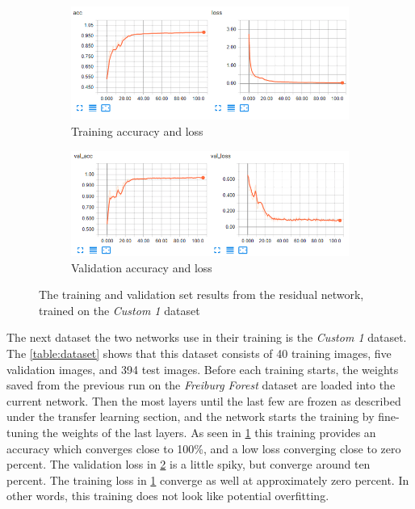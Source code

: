 \documentclass[USenglish]{ifimaster}  %
\begin{document}
\begin{figure}[ht]
\centering
\begin{subfigure}[b]{\textwidth}
\centering
\includegraphics[width=1\textwidth]{bilder/custom_1_training/Custom_1_residual_training_acc_results.png}
\caption{Training accuracy and loss}
\label{fig:custom_1_residual_acc_result}
\end{subfigure}
\hfill
\begin{subfigure}[b]{\textwidth}
\centering
\includegraphics[width=1\textwidth]{bilder/custom_1_training/Custom_1_residual_training_val_acc_results.png}
\caption{Validation accuracy and loss}
\label{fig:custom_1_residual_val_acc_result}
\end{subfigure}
\caption{The training and validation set results from the residual network, trained on the \textit{Custom 1} dataset}
\label{fig:custom_1_residual_result}
\end{figure}

The next dataset the two networks use in their training is the \textit{Custom 1} dataset. The \cref{table:dataset} shows that this dataset consists of 40 training images, five validation images, and 394 test images. Before each training starts, the weights saved from the previous run on the \textit{Freiburg Forest} dataset are loaded into the current network. Then the most layers until the last few are frozen as described under the transfer learning section, and the network starts the training by fine-tuning the weights of the last layers. As seen in \cref{fig:custom_1_residual_acc_result} this training provides an accuracy which converges close to 100\%, and a low loss converging close to zero percent. The validation loss in \cref{fig:custom_1_residual_val_acc_result} is a little spiky, but converge around ten percent. The training loss in \cref{fig:custom_1_residual_acc_result} converge as well at approximately zero percent. In other words, this training does not look like potential overfitting. 
\end{document}
